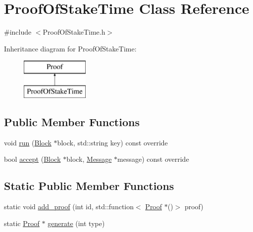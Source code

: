 \hypertarget{classProofOfStakeTime}{}\section{Proof\+Of\+Stake\+Time Class Reference}
\label{classProofOfStakeTime}


{\ttfamily \#include $<$Proof\+Of\+Stake\+Time.\+h$>$}

Inheritance diagram for Proof\+Of\+Stake\+Time\+:\begin{figure}[H]
\begin{center}
\leavevmode
\includegraphics[height=2.000000cm]{classProofOfStakeTime}
\end{center}
\end{figure}
\subsection*{Public Member Functions}
\begin{DoxyCompactItemize}
\item 
void \mbox{\hyperlink{classProofOfStakeTime_a4081abb2bc76f8039995a73e9617086c}{run}} (\mbox{\hyperlink{classBlock}{Block}} $\ast$block, std\+::string key) const override
\item 
bool \mbox{\hyperlink{classProofOfStakeTime_ae05431416e9157fb8af8247b8e756794}{accept}} (\mbox{\hyperlink{classBlock}{Block}} $\ast$block, \mbox{\hyperlink{classMessage}{Message}} $\ast$message) const override
\end{DoxyCompactItemize}
\subsection*{Static Public Member Functions}
\begin{DoxyCompactItemize}
\item 
static void \mbox{\hyperlink{classProof_a71874539fdbcc93c15594b889c95225b}{add\+\_\+proof}} (int id, std\+::function$<$ \mbox{\hyperlink{classProof}{Proof}} $\ast$()$>$ proof)
\item 
static \mbox{\hyperlink{classProof}{Proof}} $\ast$ \mbox{\hyperlink{classProof_a267f0f4587babb59884b5f280e2d54c8}{generate}} (int type)
\end{DoxyCompactItemize}
